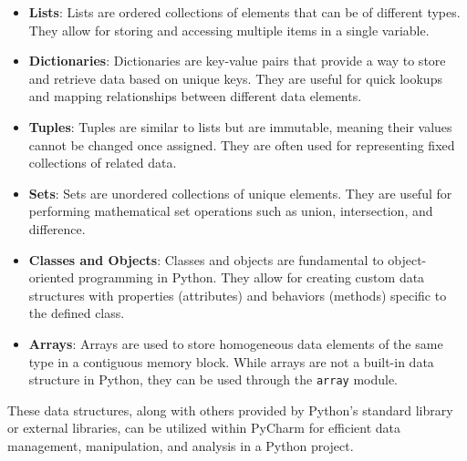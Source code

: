 \begin{itemize}
	\item \textbf{Lists}: Lists are ordered collections of elements that can be of different types. They allow for storing and accessing multiple items in a single variable.
	
	\item \textbf{Dictionaries}: Dictionaries are key-value pairs that provide a way to store and retrieve data based on unique keys. They are useful for quick lookups and mapping relationships between different data elements.
	
	\item \textbf{Tuples}: Tuples are similar to lists but are immutable, meaning their values cannot be changed once assigned. They are often used for representing fixed collections of related data.
	
	\item \textbf{Sets}: Sets are unordered collections of unique elements. They are useful for performing mathematical set operations such as union, intersection, and difference.
	
	\item \textbf{Classes and Objects}: Classes and objects are fundamental to object-oriented programming in Python. They allow for creating custom data structures with properties (attributes) and behaviors (methods) specific to the defined class.
	
	\item \textbf{Arrays}: Arrays are used to store homogeneous data elements of the same type in a contiguous memory block. While arrays are not a built-in data structure in Python, they can be used through the \texttt{array} module.
\end{itemize}

These data structures, along with others provided by Python's standard library or external libraries, can be utilized within PyCharm for efficient data management, manipulation, and analysis in a Python project.




	
